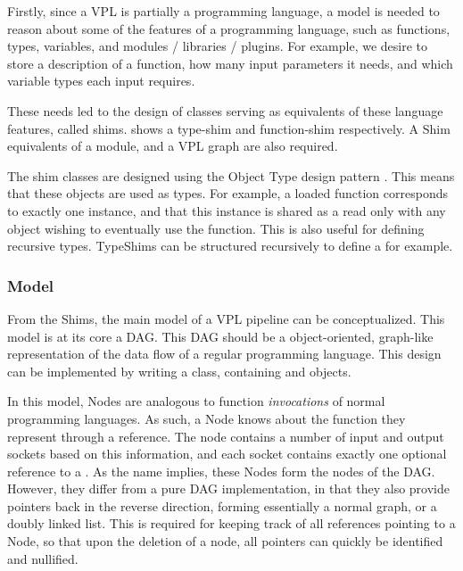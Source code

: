 Firstly, since a VPL is partially a programming language, a model is needed to reason about some of the features of a programming language, such as functions, types, variables, and modules / libraries / plugins.
For example, we desire to store a description of a function, how many input parameters it needs, and which variable types each input requires. 

These needs led to the design of classes serving as equivalents of these language features, called shims. 
 shows a type-shim and function-shim respectively. 
A Shim equivalents of a module, and a VPL graph are also required. 

The shim classes are designed using the Object Type design pattern \citep{gamma_design_1994}. 
This means that these objects are used as types. 
For example, a loaded function corresponds to exactly one  instance, and that this instance is shared as a read only with any object wishing to eventually use the function. 
This is also useful for defining recursive types. 
TypeShims can be structured recursively to define a  for example. 



\subsubsection*{Model}
\label{sec:method-model}


From the Shims, the main model of a VPL pipeline can be conceptualized. 
This model is at its core a \ac{DAG}. 
This \ac{DAG} should be a object-oriented, graph-like representation of the data flow of a regular programming language. 
This design can be implemented by writing a  class, containing  and  objects. 

In this model, Nodes are analogous to function \emph{invocations} of normal programming languages. 
As such, a Node knows about the function they represent through a  reference. 
The node contains a number of input and output sockets based on this information, and each socket contains exactly one optional reference to a .  
As the name implies, these Nodes form the nodes of the DAG. 
However, they differ from a pure DAG implementation, in that they also provide pointers back in the reverse direction, forming essentially a normal graph, or a doubly linked list. 
This is required for keeping track of all references pointing to a Node, so that upon the deletion of a node, all pointers can quickly be identified and nullified.

